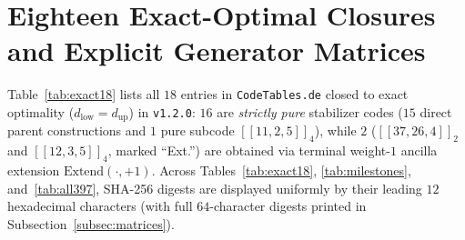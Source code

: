 \documentclass[11pt,a4paper]{article}
\theoremstyle{remark}
\begin{document}
\section{Eighteen Exact-Optimal Closures and Explicit Generator Matrices}\label{sec:results}

Table~\ref{tab:exact18} lists all $18$ entries in \texttt{CodeTables.de} closed to exact optimality ($d_{\mathrm{low}} = d_{\mathrm{up}}$) in \texttt{v1.2.0}: $16$ are \emph{strictly pure} stabilizer codes ($15$ direct parent constructions and $1$ pure subcode $[[11,2,5]]_4$), while $2$ ($[[37,26,4]]_2$ and $[[12,3,5]]_4$, marked ``Ext.'') are obtained via terminal weight-$1$ ancilla extension $\mathrm{Extend}(\cdot, +1)$. Across Tables~\ref{tab:exact18}, \ref{tab:milestones}, and~\ref{tab:all397}, SHA-256 digests are displayed uniformly by their leading $12$ hexadecimal characters (with full $64$-character digests printed in Subsection~\ref{subsec:matrices}).
\end{document}
